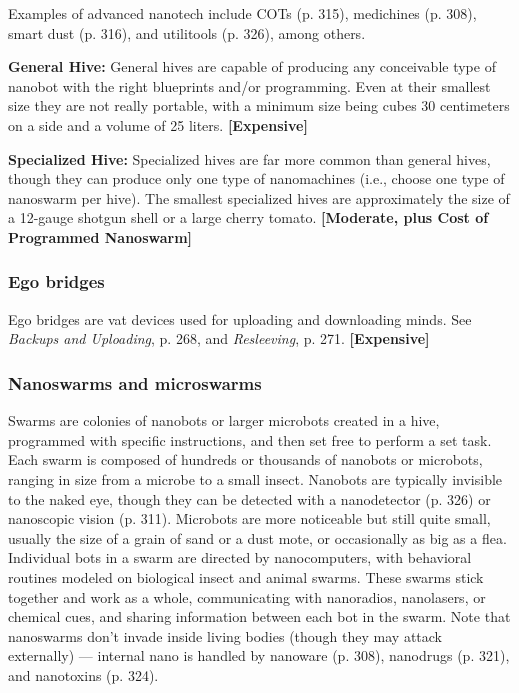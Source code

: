 Examples of advanced nanotech include COTs (p. 315), medichines (p. 308), smart dust (p. 316), and utilitools (p. 326), among others.

\textbf{General Hive:} General hives are capable of producing any conceivable type of nanobot with the right blueprints and/or programming. Even at their smallest size they are not really portable, with a minimum size being cubes 30 centimeters on a side and a volume of 25 liters. \textbf{[Expensive]}

\textbf{Specialized Hive:} Specialized hives are far more common than general hives, though they can produce only one type of nanomachines (i.e., choose one type of nanoswarm per hive). The smallest specialized hives are approximately the size of a 12-gauge shotgun shell or a large cherry tomato. \textbf{[Moderate, plus Cost of Programmed Nanoswarm]}

\subsubsection{Ego bridges}

Ego bridges are vat devices used for uploading and downloading minds. See \emph{Backups and Uploading}, p. 268, and \emph{Resleeving}, p. 271. \textbf{[Expensive]}

\subsubsection{Nanoswarms and microswarms}

Swarms are colonies of nanobots or larger microbots created in a hive, programmed with specific instructions, and then set free to perform a set task. Each swarm is composed of hundreds or thousands of nanobots or microbots, ranging in size from a microbe to a small insect. Nanobots are typically invisible to the naked eye, though they can be detected with a nanodetector (p. 326) or nanoscopic vision (p. 311). Microbots are more noticeable but still quite small, usually the size of a grain of sand or a dust mote, or occasionally as big as a flea. Individual bots in a swarm are directed by nanocomputers, with behavioral routines modeled on biological insect and animal swarms. These swarms stick together and work as a whole, communicating with nanoradios, nanolasers, or chemical cues, and sharing information between each bot in the swarm. Note that nanoswarms don’t invade inside living bodies (though they may attack externally) --- internal nano is handled by nanoware (p. 308), nanodrugs (p. 321), and nanotoxins (p. 324).

